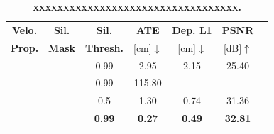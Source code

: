 \documentclass{article}
\newcommand{\greencheck}{{\color{green}\checkmark}}
\newcommand{\redx}{{\color{red}\ding{55}}}
\begin{document}
\begin{table}[t]
\centering

\scriptsize
\setlength{\tabcolsep}{5.5pt}

\begin{tabular}{ccccccc}
\toprule



\textbf{Velo.} & \textbf{Sil.} & \textbf{Sil.} & \textbf{ATE} & \textbf{Dep. L1} & \textbf{PSNR} \\
\textbf{Prop.} & \textbf{Mask} & \textbf{Thresh.} & [cm]$\downarrow$ & [cm]$\downarrow$ & [dB]$\uparrow$ \\


\midrule

\redx & \greencheck & 0.99 & 2.95 & 2.15 & 25.40 \\


\greencheck & \redx & 0.99 & 115.80 & \redx & \redx \\

\greencheck & \greencheck & 0.5 & 1.30 & 0.74 & 31.36 \\

\greencheck & \greencheck & \cellcolor{tabthird}\textbf{0.99} & \cellcolor{tabthird}\textbf{0.27} & \cellcolor{tabthird}\textbf{0.49} & \cellcolor{tabthird}\textbf{32.81} \\

\bottomrule
\end{tabular}
\caption{\textbf{xxxxxxxxxxxxxxxxxxxxxxxxxxxxxxxxxx.}}
\label{tab:ablation}
\end{table}
\end{document}
